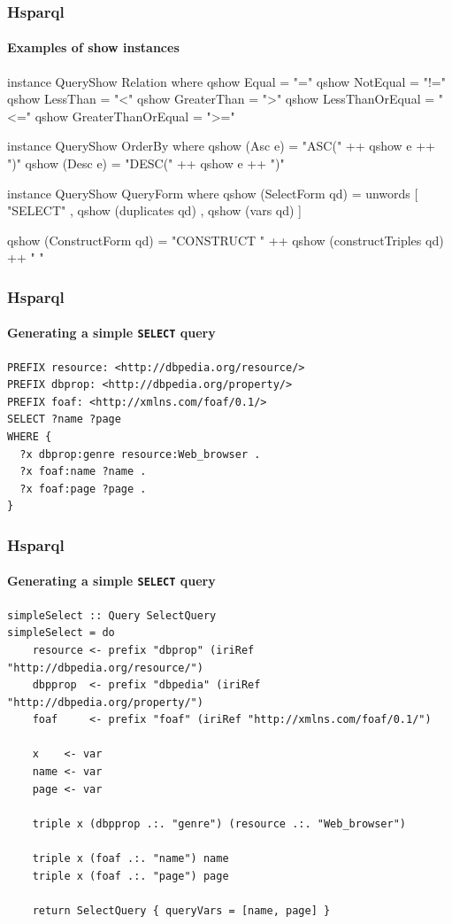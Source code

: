 \documentclass{beamer}
\begin{document}
\begin{frame}[fragile]
\frametitle{Hsparql}
\framesubtitle{Examples of show instances}

\begin{haskellcode}
instance QueryShow Relation where
  qshow Equal              = "="
  qshow NotEqual           = "!="
  qshow LessThan           = "<"
  qshow GreaterThan        = ">"
  qshow LessThanOrEqual    = "<="
  qshow GreaterThanOrEqual = ">="

instance QueryShow OrderBy where
  qshow (Asc e)  = "ASC(" ++ qshow e ++ ")"
  qshow (Desc e) = "DESC(" ++ qshow e ++ ")"

instance QueryShow QueryForm where
  qshow (SelectForm qd) =  unwords 
                        [ "SELECT"
                         , qshow (duplicates qd)
                         , qshow (vars qd)
                        ]

  qshow (ConstructForm qd) = "CONSTRUCT { " ++ qshow (constructTriples qd) ++ " }"
\end{haskellcode}
\end{frame}

\begin{frame}[fragile]
\frametitle{Hsparql}
\framesubtitle{Generating a simple \texttt{SELECT} query}

\scriptsize
\begin{verbatim}
PREFIX resource: <http://dbpedia.org/resource/>
PREFIX dbprop: <http://dbpedia.org/property/>
PREFIX foaf: <http://xmlns.com/foaf/0.1/>
SELECT ?name ?page
WHERE {
  ?x dbprop:genre resource:Web_browser .
  ?x foaf:name ?name .
  ?x foaf:page ?page .
}
\end{verbatim}
\end{frame}

\begin{frame}[fragile]
\frametitle{Hsparql}
\framesubtitle{Generating a simple \texttt{SELECT} query}

\scriptsize
\begin{verbatim}
simpleSelect :: Query SelectQuery
simpleSelect = do
    resource <- prefix "dbprop" (iriRef "http://dbpedia.org/resource/")
    dbpprop  <- prefix "dbpedia" (iriRef "http://dbpedia.org/property/")
    foaf     <- prefix "foaf" (iriRef "http://xmlns.com/foaf/0.1/")

    x    <- var
    name <- var
    page <- var

    triple x (dbpprop .:. "genre") (resource .:. "Web_browser")

    triple x (foaf .:. "name") name
    triple x (foaf .:. "page") page

    return SelectQuery { queryVars = [name, page] }
\end{verbatim}
\end{frame}
\end{document}

